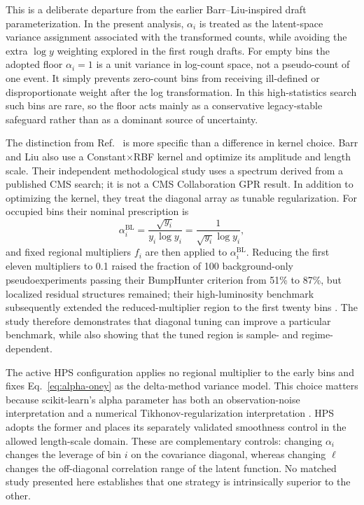 This is a deliberate departure from the earlier Barr--Liu-inspired draft
parameterization. In the present analysis, $\alpha_i$ is treated as the latent-space
variance assignment associated with the transformed counts, while avoiding the extra
$\log y$ weighting explored in the first rough drafts. For empty bins the adopted floor
$\alpha_i=1$ is a unit variance in log-count space, not a pseudo-count of one event. It
simply prevents zero-count bins from receiving ill-defined or disproportionate weight
after the log transformation. In this high-statistics search such bins are rare, so the
floor acts mainly as a conservative legacy-stable safeguard rather than as a dominant
source of uncertainty.

The distinction from Ref.~\cite{BarrLiu2025} is more specific than a difference in
kernel choice. Barr and Liu also use a Constant$\times$RBF kernel and optimize its
amplitude and length scale. Their independent methodological study uses a spectrum
derived from a published CMS search; it is not a CMS Collaboration GPR result. In
addition to optimizing the kernel, they treat the diagonal array as tunable
regularization. For occupied bins their nominal prescription is
\begin{equation}
\alpha_i^{\mathrm{BL}}
= \frac{\sqrt{y_i}}{y_i\log y_i}
= \frac{1}{\sqrt{y_i}\log y_i},
\end{equation}
and fixed regional multipliers $f_i$ are then applied to
$\alpha_i^{\mathrm{BL}}$. Reducing the first eleven multipliers to 0.1 raised the
fraction of 100 background-only pseudoexperiments passing their BumpHunter criterion
from 51\% to 87\%, but localized residual structures remained; their high-luminosity
benchmark subsequently extended the reduced-multiplier region to the first twenty
bins \cite{BarrLiu2025}. The study therefore demonstrates that diagonal tuning can
improve a particular benchmark, while also showing that the tuned region is
sample- and regime-dependent.

The active HPS configuration applies no regional multiplier to the early bins and
fixes Eq.~\eqref{eq:alpha-oney} as the delta-method variance model. This choice matters
because scikit-learn's alpha parameter has both an observation-noise interpretation
and a numerical
Tikhonov-regularization interpretation \cite{ScikitLearnGPRDocs16}. HPS adopts the
former and places its separately validated smoothness control in the allowed
length-scale domain. These are complementary controls: changing $\alpha_i$ changes
the leverage of bin $i$ on the covariance diagonal, whereas changing $\ell$ changes
the off-diagonal correlation range of the latent function. No matched study presented
here establishes that one strategy is intrinsically superior to the other.

